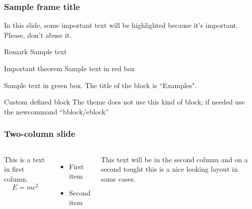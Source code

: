 \documentclass[aspectratio=169]{beamer}
\def \bblock{\begin{beamerboxesrounded}[upper=uppercolor,lower=lowercolor,shadow=true]}
\def \eblock{\end{beamerboxesrounded}}
\begin{document}
\begin{frame}
\frametitle{Sample frame title}

In this slide, some important text will be
\alert{highlighted} because it's important.
Please, don't abuse it.

\begin{block}{Remark}
Sample text
\end{block}

\begin{alertblock}{Important theorem}
Sample text in red box
\end{alertblock}

\begin{examples}
Sample text in green box. The title of the block is ``Examples".
\end{examples}

\bblock{Custom defined block}
The theme does not use this kind of block; if needed use the newcommand ``bblock/eblock''
\eblock

\end{frame}


\begin{frame}
\frametitle{Two-column slide}

\begin{columns}

This is a text in first column.
$$E=mc^2$$
\begin{itemize}
\item First item
\item Second item
\end{itemize}

This text will be in the second column
and on a second tought this is a nice looking
layout in some cases.
\end{columns}
\end{frame}
\end{document}
